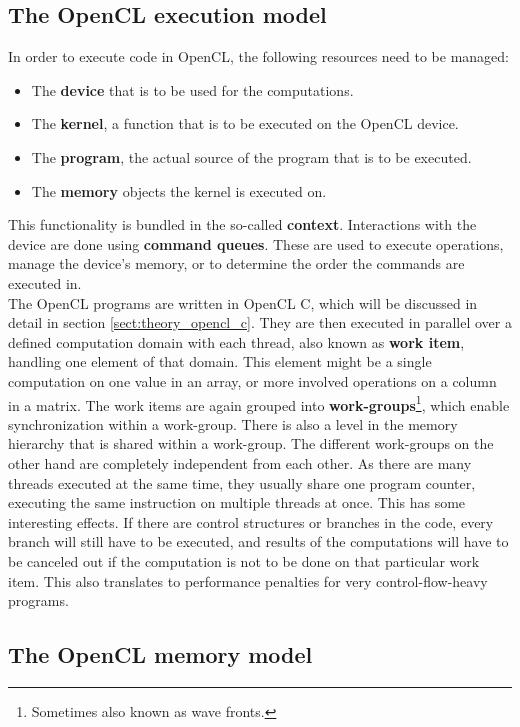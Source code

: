 \subsection{The OpenCL execution model}
In order to execute code in OpenCL, the following resources need to be managed:
\begin{itemize}
	\item The \textbf{device} that is to be used for the computations.
	\item The \textbf{kernel}, a function that is to be executed on the OpenCL device.
	\item The \textbf{program}, the actual source of the program that is to be executed.
	\item The \textbf{memory} objects the kernel is executed on.
\end{itemize}
This functionality is bundled in the so-called \textbf{context}. Interactions with the device are done using \textbf{command queues}. These are used to execute operations, manage the device's memory, or to determine the order the commands are executed in. \cite{khronos2012specification} \\

The OpenCL programs are written in OpenCL C, which will be discussed in detail in section \ref{sect:theory_opencl_c}. They are then executed in parallel over a defined computation domain with each thread, also known as \textbf{work item}, handling one element of that domain. This element might be a single computation on one value in an array, or more involved operations on a column in a matrix. The work items are again grouped into \textbf{work-groups}\footnote{Sometimes also known as wave fronts.}, which enable synchronization within a work-group. There is also a level in the memory hierarchy that is shared within a work-group. The different work-groups on the other hand are completely independent from each other. As there are many threads executed at the same time, they usually share one program counter, executing the same instruction on multiple threads at once. This has some interesting effects. If there are control structures or branches in the code, every branch will still have to be executed, and results of the computations will have to be canceled out if the computation is not to be done on that particular work item. This also translates to performance penalties for very control-flow-heavy programs. \cite{tompson2012introduction}

\subsection{The OpenCL memory model}
\label{sect:theory_opencl_memory}


